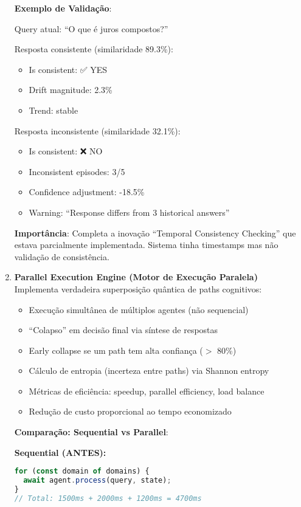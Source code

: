 \documentclass[11pt]{article}
\begin{document}
\begin{enumerate}
\textbf{Exemplo de Validação}:

Query atual: ``O que é juros compostos?''

Resposta consistente (similaridade 89.3\%):
\begin{itemize}
    \item Is consistent: ✅ YES
    \item Drift magnitude: 2.3\%
    \item Trend: stable
\end{itemize}

Resposta inconsistente (similaridade 32.1\%):
\begin{itemize}
    \item Is consistent: ❌ NO
    \item Inconsistent episodes: 3/5
    \item Confidence adjustment: -18.5\%
    \item Warning: ``Response differs from 3 historical answers''
\end{itemize}

\textbf{Importância}: Completa a inovação ``Temporal Consistency Checking'' que estava parcialmente implementada. Sistema tinha timestamps mas não validação de consistência.

    \item \textbf{Parallel Execution Engine (Motor de Execução Paralela)} \\
    Implementa verdadeira superposição quântica de paths cognitivos:
    \begin{itemize}
        \item Execução simultânea de múltiplos agentes (não sequencial)
        \item ``Colapso'' em decisão final via síntese de respostas
        \item Early collapse se um path tem alta confiança ($>$ 80\%)
        \item Cálculo de entropia (incerteza entre paths) via Shannon entropy
        \item Métricas de eficiência: speedup, parallel efficiency, load balance
        \item Redução de custo proporcional ao tempo economizado
    \end{itemize}

\textbf{Comparação: Sequential vs Parallel}:

\textbf{Sequential (ANTES):}
\begin{lstlisting}[language=JavaScript]
for (const domain of domains) {
  await agent.process(query, state);
}
// Total: 1500ms + 2000ms + 1200ms = 4700ms
\end{lstlisting}


\end{enumerate}
\end{document}

